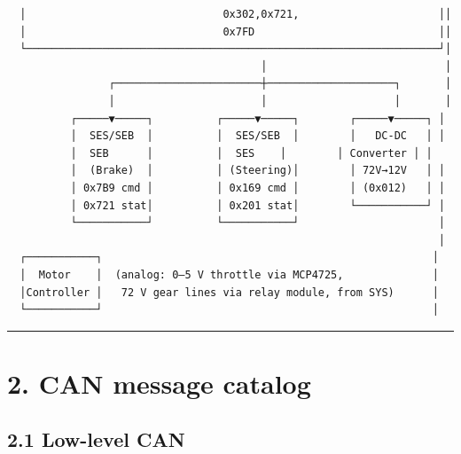 \documentclass[12pt,a4paper,oneside]{report}
\begin{document}
\begin{verbatim}
  │                               0x302,0x721,                      ││
  │                               0x7FD                             ││
  └─────────────────────────────────────────────────────────────────┘│
                                        │                            │
                ┌───────────────────────┼────────────────────┐       │
                │                       │                    │       │
          ┌─────▼─────┐          ┌─────▼─────┐        ┌─────▼─────┐ │
          │  SES/SEB  │          │  SES/SEB  │        │   DC-DC   │ │
          │  SEB      │          │  SES    │        │ Converter │ │
          │  (Brake)  │          │ (Steering)│        │ 72V→12V   │ │
          │ 0x7B9 cmd │          │ 0x169 cmd │        │ (0x012)   │ │
          │ 0x721 stat│          │ 0x201 stat│        └───────────┘ │
          └───────────┘          └───────────┘                      │
                                                                    │
  ┌───────────┐                                                    │
  │  Motor    │  (analog: 0–5 V throttle via MCP4725,              │
  │Controller │   72 V gear lines via relay module, from SYS)      │
  └───────────┘                                                    │
\end{verbatim}

\begin{center}\rule{0.5\linewidth}{0.5pt}\end{center}

\section{2. CAN message catalog}\label{can-message-catalog}

\subsection{2.1 Low-level CAN}\label{low-level-can}
\end{document}
